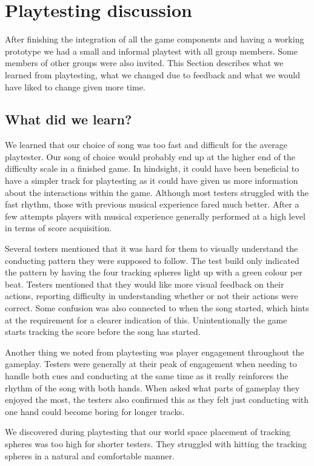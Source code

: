 \section{Playtesting discussion}
After finishing the integration of all the game components and having a working prototype we had a small and informal playtest with all group members. Some members of other groups were also invited. This Section describes what we learned from playtesting, what we changed due to feedback and what we would have liked to change given more time. 

\subsection{What did we learn?}
We learned that our choice of song was too fast and difficult for the average playtester. Our song of choice would probably end up at the higher end of the difficulty scale in a finished game. In hindsight, it could have been beneficial to have a simpler track for playtesting as it could have given us more information about the interactions within the game. Although most testers struggled with the fast rhythm, those with previous musical experience fared much better. After a few attempts players with musical experience generally performed at a high level in terms of score acquisition.

Several testers mentioned that it was hard for them to visually understand the conducting pattern they were supposed to follow. The test build only indicated the pattern by having the four tracking spheres light up with a green colour per beat. Testers mentioned that they would like more visual feedback on their actions, reporting difficulty in understanding whether or not their actions were correct. 
Some confusion was also connected to when the song started, which hints at the requirement for a clearer indication of this. Unintentionally the game starts tracking the score before the song has started.

Another thing we noted from playtesting was player engagement throughout the gameplay. Testers were generally at their peak of engagement when needing to handle both cues and conducting at the same time as it really reinforces the rhythm of the song with both hands. When asked what parts of gameplay they enjoyed the most, the testers also confirmed this as they felt just conducting with one hand could become boring for longer tracks.  

We discovered during playtesting that our world space placement of tracking spheres was too high for shorter testers. They struggled with hitting the tracking spheres in a natural and comfortable manner.

